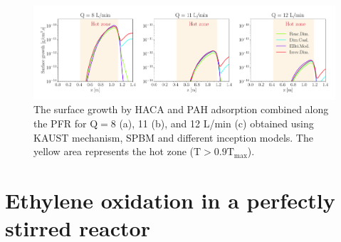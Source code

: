 \begin{figure}[H]
	\centering
	\includegraphics[width=1\textwidth]{Figures/Results/PFR/surface_growth.pdf}
	\caption{The surface growth by HACA and PAH adsorption combined along the PFR for $\mathrm{Q}=8$ (a), 11 (b), and 12 L/min (c) obtained using KAUST mechanism, SPBM and different inception models. The yellow area represents the hot zone ($\mathrm{T}>0.9\mathrm{T_{max}}$).}
	\label{fig:pfr_surfacegrowth} 
\end{figure}



\section{Ethylene oxidation in a perfectly stirred reactor}

